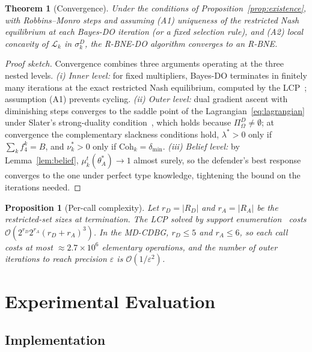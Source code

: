 \documentclass[conference]{IEEEtran}
\newtheorem{theorem}{Theorem}
\newtheorem{proposition}{Proposition}
\newcommand{\Coh}{\mathrm{Coh}}
\begin{document}
\begin{theorem}[Convergence]\label{thm:conv}
Under the conditions of Proposition~\ref{prop:existence}, with Robbins--Monro
steps and assuming (A1) uniqueness of the restricted Nash equilibrium at each
Bayes-DO iteration (or a fixed selection rule), and (A2) local concavity of
$\mathcal{L}_k$ in $\sigma_k^D$, the R-BNE-DO algorithm converges to an R-BNE.
\end{theorem}

\begin{proof}[Proof sketch]
Convergence combines three arguments operating at the three nested levels.
\emph{(i) Inner level:} for fixed multipliers, Bayes-DO terminates in finitely
many iterations at the exact restricted Nash equilibrium, computed by the
LCP~\cite{lemke1964}; assumption (A1) prevents cycling. \emph{(ii) Outer level:}
dual gradient ascent with diminishing steps converges to the saddle point of the
Lagrangian~\eqref{eq:lagrangian} under Slater's strong-duality condition~\cite{boyd2004}, which
holds because $\Pi^D_\Omega\neq\emptyset$; at convergence the complementary
slackness conditions hold, $\lambda^*>0$ only if $\sum_k f_4^k=B$, and
$\nu_k^*>0$ only if $\Coh_k=\delta_{\min}$. \emph{(iii) Belief level:} by
Lemma~\ref{lem:belief}, $\mu_k^t(\theta_A^*)\to1$ almost surely, so the
defender's best response converges to the one under perfect type knowledge,
tightening the bound on the iterations needed.
\end{proof}

\begin{proposition}[Per-call complexity]
\label{prop:complexity}
Let $r_D=|R_D|$ and $r_A=|R_A|$ be the restricted-set sizes at termination.
The LCP solved by support enumeration~\cite{porter2008} costs
$\mathcal{O}(2^{r_D}2^{r_A}(r_D+r_A)^3)$. In the MD-CDBG, $r_D\leq5$ and
$r_A\leq6$, so each call costs at most $\approx2.7\times10^6$ elementary
operations, and the number of outer iterations to reach precision $\varepsilon$
is $\mathcal{O}(1/\varepsilon^2)$.
\end{proposition}

\section{Experimental Evaluation}
\label{sec:results}

\subsection{Implementation}
\end{document}
